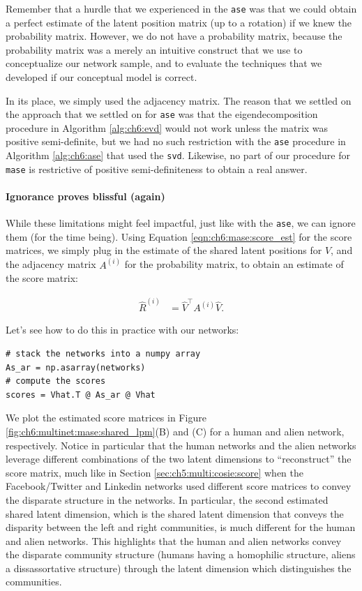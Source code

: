 Remember that a hurdle that we experienced in the \texttt{ase} was that we could obtain a perfect estimate of the latent position matrix (up to a rotation) if we knew the probability matrix. However, we do not have a probability matrix, because the probability matrix was a merely an intuitive construct that we use to conceptualize our network sample, and to evaluate the techniques that we developed if our conceptual model is correct. 

In its place, we simply used the adjacency matrix. The reason that we settled on the approach that we settled on for \texttt{ase} was that the eigendecomposition procedure in Algorithm \ref{alg:ch6:evd} would not work unless the matrix was positive semi-definite, but we had no such restriction with the \texttt{ase} procedure in Algorithm \ref{alg:ch6:ase} that used the \texttt{svd}. Likewise, no part of our procedure for \texttt{mase} is restrictive of positive semi-definiteness to obtain a real answer.

\paragraph*{Ignorance proves blissful (again)}

While these limitations might feel impactful, just like with the \texttt{ase}, we can ignore them (for the time being). Using Equation \eqref{eqn:ch6:mase:score_est} for the score matrices, we simply plug in the estimate of the shared latent positions for $V$, and the adjacency matrix $A^{(i)}$ for the probability matrix, to obtain an estimate of the score matrix:

\begin{align*}
    \hat R^{(i)} &= \hat V^\top A^{(i)}\hat V.
\end{align*}

Let's see how to do this in practice with our networks:

\begin{lstlisting}[style=python]
# stack the networks into a numpy array
As_ar = np.asarray(networks)
# compute the scores
scores = Vhat.T @ As_ar @ Vhat
\end{lstlisting}
We plot the estimated score matrices in Figure \ref{fig:ch6:multinet:mase:shared_lpm}(B) and (C) for a human and alien network, respectively. Notice in particular that the human networks and the alien networks leverage different combinations of the two latent dimensions to ``reconstruct'' the score matrix, much like in Section \ref{sec:ch5:multi:cosie:score} when the Facebook/Twitter and Linkedin networks used different score matrices to convey the disparate structure in the networks. In particular, the second estimated shared latent dimension, which is the shared latent dimension that conveys the disparity between the left and right communities, is much different for the human and alien networks. This highlights that the human and alien networks convey the disparate community structure (humans having a homophilic structure, aliens a dissassortative structure) through the latent dimension which distinguishes the communities.

